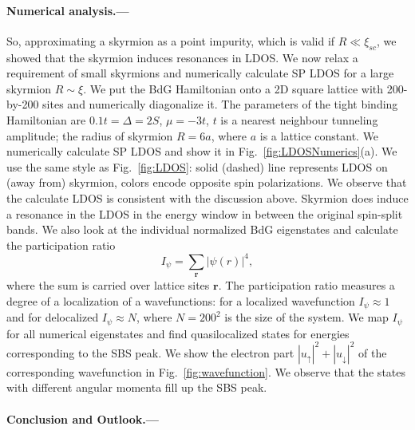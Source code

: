 \documentclass[twocolumn,showpacs,floatfix,longbibliography]{revtex4-1}
\begin{document}
\paragraph*{Numerical analysis.---} \label{sec:numerics} 
So, approximating a skyrmion as a point impurity, which is valid if $R\ll\xi_{sc}$, we showed that the skyrmion induces resonances in LDOS. We now relax a requirement of small skyrmions and numerically calculate SP LDOS for a large skyrmion $R\sim \xi$. We put the BdG Hamiltonian onto a 2D square lattice with 200-by-200 sites and numerically diagonalize it. The parameters of the tight binding Hamiltonian are $0.1t=\Delta=2S$, $\mu = -3t$, $t$ is a nearest neighbour tunneling amplitude; the radius of skyrmion $R = 6a$, where $a$ is a lattice constant. We numerically calculate SP LDOS and show it in Fig.~\ref{fig:LDOSNumerics}(a). We use the same style as Fig.~\ref{fig:LDOS}: solid (dashed) line represents LDOS on (away from) skyrmion, colors encode opposite spin polarizations. We observe that the calculate LDOS is consistent with the discussion above. Skyrmion does induce a resonance in the LDOS in the energy window in between the original spin-split bands. We also look at the individual normalized BdG eigenstates and calculate the participation ratio
\begin{equation}
	I_\psi = \sum_{\bm r} |\psi(r)|^4,
	\label{I}
\end{equation}
where the sum is carried over lattice sites $\bm r$. The participation ratio measures a degree of a localization of a wavefunctions: for a localized wavefunction $I_\psi \approx 1$ and for delocalized $I_\psi \approx N$, where $N = 200^2$ is the size of the system. We map $I_\psi$ for all numerical eigenstates and find quasilocalized states for energies corresponding to the SBS peak. We show the electron part  $|u_{\uparrow}|^2+|u_{\downarrow}|^2$ of the corresponding wavefunction in Fig.~\ref{fig:wavefunction}. We observe that the states with different angular momenta fill up the SBS peak. 




\paragraph*{Conclusion and Outlook.---} \label{sec:conclusion}
\end{document}
